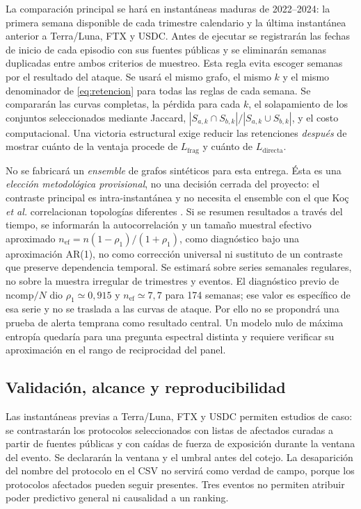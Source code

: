 \documentclass[journal]{IEEEtran}
\begin{document}
La comparación principal se hará en instantáneas maduras de 2022--2024:
la primera semana disponible de cada trimestre calendario y la última
instantánea anterior a Terra/Luna, FTX y USDC. Antes de ejecutar se registrarán
las fechas de inicio de cada episodio con sus fuentes públicas y se eliminarán
semanas duplicadas entre ambos criterios de muestreo. Esta regla evita
escoger semanas por el resultado del ataque. Se usará el mismo grafo, el mismo
$k$ y el mismo denominador de \eqref{eq:retencion} para todas las reglas de
cada semana. Se compararán las curvas completas, la pérdida para cada $k$,
el solapamiento de los conjuntos seleccionados mediante Jaccard,
$|S_{a,k}\cap S_{b,k}|/|S_{a,k}\cup S_{b,k}|$, y el costo computacional.
Una victoria estructural exige reducir las retenciones \emph{después} de
mostrar cuánto de la ventaja procede de $L_{\mathrm{frag}}$ y cuánto de
$L_{\mathrm{directa}}$.

No se fabricará un \emph{ensemble} de grafos sintéticos para esta entrega.
Ésta es una \emph{elección metodológica provisional}, no una decisión cerrada
del proyecto: el contraste principal es intra-instantánea y no necesita el
ensemble con el que Koç \emph{et al.} correlacionan topologías diferentes
\cite{koc2014topological}. Si se resumen resultados a través del tiempo,
se informarán la autocorrelación y un tamaño muestral efectivo aproximado
$n_{\mathrm{ef}}=n(1-\rho_1)/(1+\rho_1)$, como diagnóstico bajo una
aproximación AR(1), no como corrección universal ni sustituto de un contraste
que preserve dependencia temporal. Se estimará sobre series semanales regulares,
no sobre la muestra irregular de trimestres y eventos. El diagnóstico previo
de $\mathrm{ncomp}/N$ dio $\rho_1\simeq0{,}915$ y $n_{\mathrm{ef}}\simeq7{,}7$
para 174 semanas; ese valor es específico de esa serie y no se traslada a las
curvas de ataque. Por ello no se propondrá una prueba de
alerta temprana como resultado central. Un modelo nulo de máxima entropía
\cite{macchiati2024spectral} quedaría para una pregunta espectral distinta y
requiere verificar su aproximación en el rango de reciprocidad del panel.

\subsection{Validación, alcance y reproducibilidad}

Las instantáneas previas a Terra/Luna, FTX y USDC permiten estudios de caso:
se contrastarán los protocolos seleccionados con listas de afectados curadas
a partir de fuentes públicas y con caídas de fuerza de exposición durante la
ventana del evento. Se declararán la ventana y el umbral antes del cotejo.
La desaparición del nombre del protocolo en el CSV no servirá como verdad de
campo, porque los protocolos afectados pueden seguir presentes. Tres eventos
no permiten atribuir poder predictivo general ni causalidad a un ranking.
\end{document}

